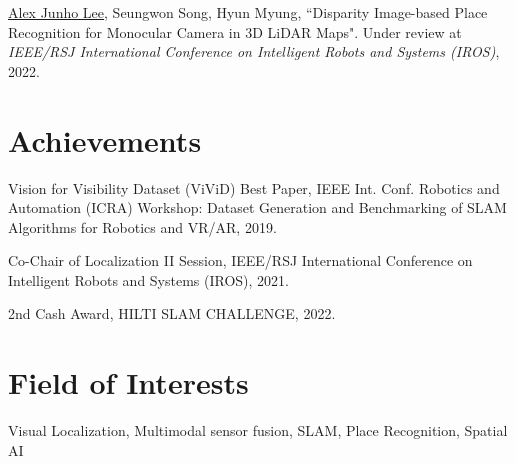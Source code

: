 \documentclass[margin]{res}
\begin{document}
\begin{resume}
		\par\underline{Alex Junho Lee}, Seungwon Song, Hyun Myung, ``Disparity Image-based Place Recognition for Monocular Camera in 3D LiDAR Maps". Under review at \textit{IEEE/RSJ International Conference on Intelligent Robots and Systems (IROS)}, 2022.
		
		\section{Achievements}
		
		\par Vision for Visibility Dataset (ViViD)
		Best Paper, IEEE Int. Conf. Robotics and Automation (ICRA) Workshop: Dataset Generation and Benchmarking of SLAM Algorithms for Robotics and VR/AR, 2019.
						
		\par Co-Chair of Localization II Session, IEEE/RSJ International Conference on Intelligent Robots and Systems (IROS), 2021.
		
		\par 2nd Cash Award, HILTI SLAM CHALLENGE, 2022.
		
				
		\section{Field of Interests}
		Visual Localization, Multimodal sensor fusion, SLAM, Place Recognition, Spatial AI
		\newpage

\end{resume}
\end{document}
